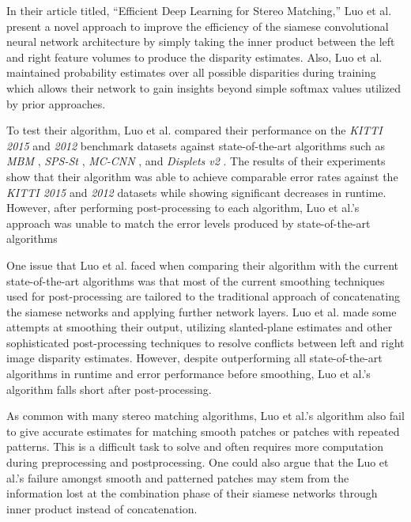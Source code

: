 \documentclass{article}
\begin{document}
In their article titled, “Efficient Deep Learning for Stereo Matching,” Luo et al. \citep{luo2016efficient} present a novel approach to improve the efficiency of the siamese convolutional neural network architecture by simply taking the inner product between the left and right feature volumes to produce the disparity estimates. Also, Luo et al. maintained probability estimates over all possible disparities during training which allows their network to gain insights beyond simple softmax values utilized by prior approaches.

To test their algorithm, Luo et al. \citep{luo2016efficient} compared their performance on the \textit{KITTI 2015} and \textit{2012} \citep{geiger2012we} benchmark datasets against state-of-the-art algorithms such as \textit{MBM} \citep{einecke2015multi}, \textit{SPS-St} \citep{yamaguchi2014efficient}, \textit{MC-CNN} \citep{zbontar2016stereo}, and \textit{Displets v2} \citep{guney2015displets}. The results of their experiments show that their algorithm was able to achieve comparable error rates against the \textit{KITTI 2015} and \textit{2012} \citep{geiger2012we} datasets while showing significant decreases in runtime. However, after performing post-processing to each algorithm, Luo et al.’s approach was unable to match the error levels produced by state-of-the-art algorithms

One issue that Luo et al. \citep{luo2016efficient} faced when comparing their algorithm with the current state-of-the-art algorithms was that most of the current smoothing techniques used for post-processing are tailored to the traditional approach of concatenating the siamese networks and applying further network layers. Luo et al. made some attempts at smoothing their output, utilizing slanted-plane estimates and other sophisticated post-processing techniques to resolve conflicts between left and right image disparity estimates. However, despite outperforming all state-of-the-art algorithms in runtime and error performance before smoothing, Luo et al.'s algorithm falls short after post-processing.

As common with many stereo matching algorithms, Luo et al.'s algorithm \citep{luo2016efficient} also fail to give accurate estimates for matching smooth patches or patches with repeated patterns. This is a difficult task to solve and often requires more computation during preprocessing and postprocessing. One could also argue that the Luo et al.'s failure amongst smooth and patterned patches may stem from the information lost at the combination phase of their siamese networks through inner product instead of concatenation.
\end{document}
